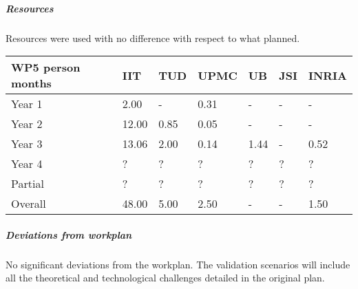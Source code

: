 
\subparagraph*{Resources}

Resources were used with no difference with respect to what planned. 

\begin{center}
\begin{tabular}{|C{1.5cm}|C{1.5cm}|C{1.5cm}|C{2cm}|C{2cm}|C{2cm}|C{2cm}|}
\hline
\footnotesize \textbf{WP5 person months}& \footnotesize \textbf{IIT}&\footnotesize \textbf{TUD}&\footnotesize \textbf{UPMC}& \footnotesize \textbf{UB} &\footnotesize \textbf{JSI} & \footnotesize \textbf{INRIA} \\ \hline
\footnotesize Year 1  &  2.00  & -    & 0.31 & -    & - & -     \\  \hline
\footnotesize Year 2  &  12.00 & 0.85 & 0.05 & -    & - & -     \\  \hline
\footnotesize Year 3  &  13.06 & 2.00 & 0.14 & 1.44 & - & 0.52 \\ \hline
\footnotesize Year 4  & ?     & ?    & ?    & ?    & ?    & ?    \\   	\hline
\footnotesize Partial & ?     & ?    & ?    & ?    & ?    & ?    \\
\hline \hline
\footnotesize Overall &  48.00 & 5.00 & 2.50 & - & - & 1.50 \\ \hline
\end{tabular}
\end{center}

\subparagraph*{Deviations from workplan} 
No significant deviations from the workplan. The validation scenarios will include all the theoretical and technological challenges detailed in the original plan.
